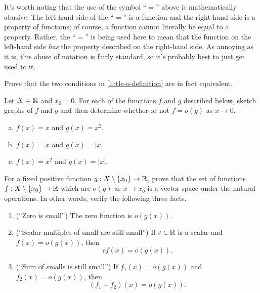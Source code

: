 \begin{remark}
	It's worth noting that the use of the symbol ``$=$'' above is mathematically abusive. The left-hand side of the ``$=$'' is a function and the right-hand side is a property of functions; of course, a function cannot literally be equal to a property. Rather, the ``$=$'' is being used here to mean that the function on the left-hand side \emph{has} the property described on the right-hand side. As annoying as it is, this abuse of notation is fairly standard, so it's probably best to just get used to it. 
\end{remark}

\begin{exercise} \label{little-o-equivalent-exercise}
	Prove that the two conditions in \cref{little-o-definition} are in fact equivalent. 
\end{exercise}

\begin{exercise}
	Let $X = \mathbb{R}$ and $x_0 = 0$. For each of the functions $f$ and $g$ described below, sketch graphs of $f$ and $g$ and then determine whether or not $f = o(g)$ as $x \to 0$.
	\begin{enumerate}[(a)]
		\item $f(x) = x$ and $g(x) = x^2$. 
		\item $f(x) = x$ and $g(x) = |x|$. 
		\item $f(x) = x^2$ and $g(x) = |x|$. 
	\end{enumerate}
\end{exercise}

\begin{exercise} \label{little-o-vector-space}
	For a fixed positive function $g : X \setminus \{x_0\} \to \mathbb{R}$, prove that the set of functions $f : X \setminus \{x_0\} \to \mathbb{R}$ which are $o(g)$ as $x \to x_0$ is a vector space under the natural operations. In other words, verify the following three facts. 
	\begin{enumerate}[(1)]
		\item (``Zero is small'') The zero function is $o(g(x))$. 
		\item (``Scalar multiples of small are still small'') If $c \in \mathbb{R}$ is a scalar and $f(x) = o(g(x))$, then 
		\[ cf(x) = o(g(x)). \] 
		\item (``Sum of smalls is still small'') If $f_1(x) = o(g(x))$ and $f_2(x) = o(g(x))$, then \[ (f_1 + f_2)(x) = o(g(x)). \]
	\end{enumerate}
\end{exercise}

